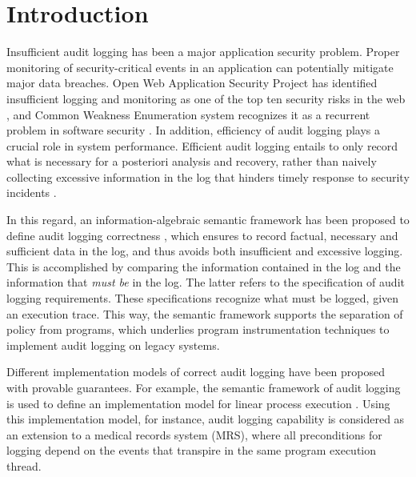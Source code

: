 \section{Introduction} \label{sec:intro}

Insufficient audit logging has been a major application security problem. Proper monitoring of security-critical events in an application can potentially mitigate major data breaches. %
Open Web Application Security Project has identified insufficient logging and monitoring as one of the top ten security risks in the web \cite{owasp-top-ten}, and Common Weakness Enumeration system recognizes it as a recurrent problem in software security \cite{cwe778}. In addition, efficiency of audit logging plays a crucial role in system performance. Efficient audit logging entails to only record what is necessary for a posteriori analysis and recovery, rather than naively collecting excessive information in the log that hinders timely response to security incidents \cite{cwe779}. 

In this regard, an information-algebraic \cite{Kohlas14} semantic framework has been proposed to define audit logging correctness \cite{amir-chong-skalka-post16}, which ensures to record factual, necessary and sufficient data in the log, and thus avoids both insufficient and excessive logging.  This is accomplished by comparing the information contained in the log and the information that \emph{must be} in the log. The latter refers to the specification of audit logging requirements. These specifications recognize what must be logged, given an execution trace. This way, the semantic framework supports the separation of policy from programs, which underlies program instrumentation techniques to implement audit logging on legacy systems.%

Different implementation models of correct audit logging have been proposed with provable guarantees. For example, the semantic framework of audit logging is used to define an implementation model for linear process execution \cite{amir-chong-skalka-post16}. Using this implementation model, for instance, audit logging capability is considered as an extension to a medical records system (MRS), where all preconditions for logging depend on the events that transpire in the same program execution thread. %


